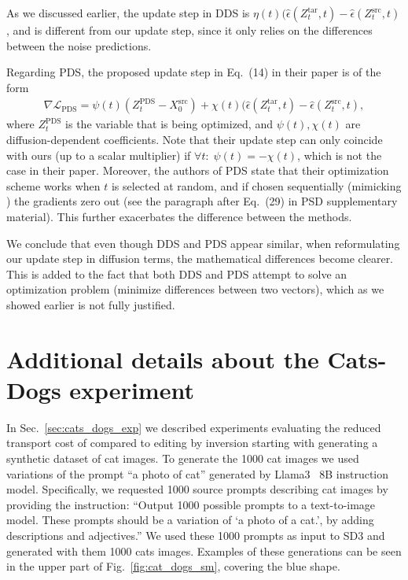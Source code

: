 As we discussed earlier, the update step in DDS is $\eta(t)(\hat{\epsilon}(Z^{\text{tar}}_t,t)-\hat{\epsilon}(Z^{\text{src}}_t,t)$, and is different from our update step, since it only relies on the differences between the noise predictions. 

Regarding PDS\cite{koo2024posterior}, the proposed update step in Eq.~(14) in their paper is of the form
\begin{align}
    \nabla\mathcal{L}_{\text{PDS}}=\psi(t)(Z^{\text{PDS}}_t -X^{\text{src}}_0)+\chi(t)(\hat{\epsilon}(Z^{\text{tar}}_t,t)-\hat{\epsilon}(Z^{\text{src}}_t,t),
\end{align}
where $Z^{\text{PDS}}_t$ is the variable that is being optimized, and $\psi(t),\chi(t)$ are diffusion-dependent coefficients. Note that their update step can only coincide with ours (up to a scalar multiplier) if $\forall t:\; \psi(t)=-\chi(t)$, which is not the case in their paper. 
Moreover, the authors of PDS state that their optimization scheme works when $t$ is selected at random, and if chosen sequentially (mimicking \ours{}) the gradients zero out (see the paragraph after Eq.~(29) in PSD supplementary material). This further exacerbates the difference between the methods.

We conclude that even though DDS and PDS  appear similar, when reformulating our update step in diffusion terms, the mathematical differences become clearer. This is added to the fact that both DDS and PDS attempt to solve an optimization problem (minimize differences between two vectors), which as we showed earlier is not fully justified. 

\clearpage
\section{Additional details about the Cats-Dogs experiment}
\label{sm:cats_dogs}

In Sec.~\ref{sec:cats_dogs_exp} we described experiments evaluating the reduced transport cost of \ours{} compared to editing by inversion starting with generating a synthetic dataset of cat images. To generate the 1000 cat images we used variations of the prompt ``a photo of cat'' generated by Llama3~\citep{dubey2024llama3} 8B instruction model. 
Specifically, we requested 1000 source prompts describing cat images by providing the instruction: ``Output 1000 possible prompts to a text-to-image model. These prompts should be a variation of `a photo of a cat.', by adding descriptions and adjectives.'' 
We used these 1000 prompts as input to SD3 and generated with them 1000 cats images. Examples of these generations can be seen in the upper part of Fig.~\ref{fig:cat_dogs_sm}, covering the blue shape. 

